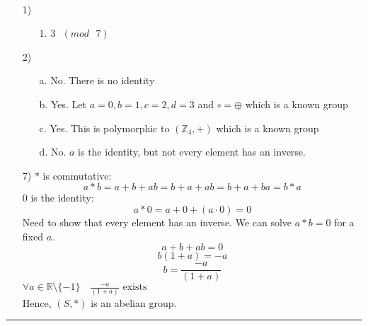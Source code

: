 \documentclass[11pt]{article}
\begin{document}
\begin{solution} \hfill \\
\begin{itemize}
    \item[1)] \begin{itemize}
        \item[1.] $3\textrm{ }(mod\textrm{ }7)$
    \end{itemize}
    \item[2)] \begin{itemize}
        \item[a.] No. There is no identity
        \item[b.] Yes. Let $a=0, b=1,c=2,d=3$ and $\circ = \oplus$ which is a known group
        \item[c.] Yes. This is polymorphic to $(\mathbb{Z}_4, +)$ which is a known group  
        \item[d.] No. $a$ is the identity, but not every element has an inverse.
    \end{itemize}
    \item[7)] $*$ is commutative:
    $$a*b = a+b+ab=b+a+ab=b+a+ba=b*a$$
    $0$ is the identity:
    $$a*0=a+0+(a\cdot 0)=0$$
    Need to show that every element has an inverse. We can solve $a*b=0$ for a fixed $a$.
    $$a+b+ab=0$$
    $$b(1+a)=-a$$
    $$b=\frac{-a}{(1+a)}$$
    $\forall a\in\mathbb{R}\setminus \{-1\}\quad \frac{-a}{(1+a)} \textrm{ exists} $\\
    Hence, $(S,*)$ is an abelian group.
\end{itemize}
\end{solution}
\vspace{6pt}
\hrule
\vspace{6pt}
\end{document}
